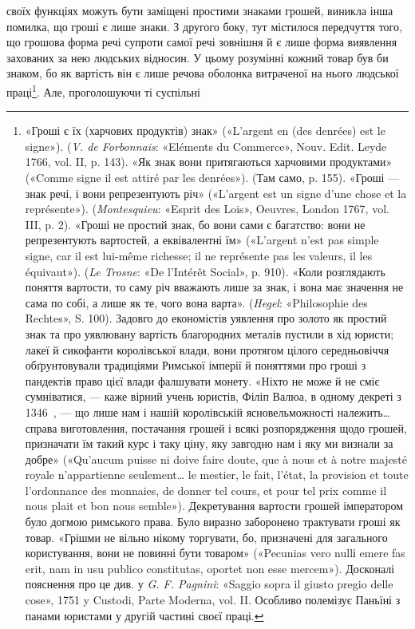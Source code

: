 своїх функціях можуть бути заміщені простими знаками грошей,
виникла інша помилка, що гроші є лише знаки. З другого боку,
тут містилося передчуття того, що грошова форма речі супроти
самої речі зовнішня й є лише форма виявлення захованих за нею
людських відносин. У цьому розумінні кожний товар був би
знаком, бо як вартість він є лише речова оболонка витраченої
на нього людської праці\footnote{
«Гроші є їх (харчових продуктів) знак» («L’argent en (des denrées)
est le signe»). (\emph{V. de Forbonnais}: «Eléments du Commerce»,
Nouv. Edit. Leyde 1766, vol. II, p. 143). «Як знак вони притягаються
харчовими продуктами» («Comme signe il est attiré par les denrées»). (Там
само, p. 155). «Гроші — знак речі, і вони репрезентують річ» («L’argent
est un signe d’une chose et la représente»). (\emph{Montesquieu}: «Esprit des
Lois», Oeuvres, London 1767, vol. III, p. 2). «Гроші не простий знак,
бо вони сами є багатство: вони не репрезентують вартостей, а еквівалентні
їм» («L’argent n’est pas simple signe, car il est lui-même richesse; il
ne représente pas les valeurs, il les équivaut»). (\emph{Le Trosne}: «De l’Intérêt
Social», p. 910). «Коли розглядають поняття вартости, то саму річ
вважають лише за знак, і вона має значення не сама по собі, а лише як
те, чого вона варта». (\emph{Hegel}: «Philosophie des Rechtes», S. 100). Задовго
до економістів уявлення про золото як простий знак та про уявлювану
вартість благородних металів пустили в хід юристи; лакеї й сикофанти
королівської влади, вони протягом цілого середньовіччя обґрунтовували
традиціями Римської імперії й поняттями про гроші з пандектів
право цієї влади фалшувати монету. «Ніхто не може й не сміє сумніватися,
— каже вірний учень юристів, Філіп Валюа, в одному декреті з 1346~, —
що лише нам і нашій королівській ясновельможності належить\dots{} справа
виготовлення, постачання грошей і всякі розпорядження щодо грошей,
призначати їм такий курс і таку ціну, яку завгодно нам і яку ми визнали
за добре» («Qu’aucum puisse ni doive faire doute, que à nous et à notre
majesté royale n’appartienne seulement\dots{} le mestier, le fait, l’état, la provision
et toute l’ordonnance des monnaies, de donner tel cours, et pour tel
prix comme il nous plait et bon nous semble»). Декретування вартости
грошей імператором було догмою римського права. Було виразно заборонено
трактувати гроші як товар. «Грішми не вільно нікому торгувати,
бо, призначені для загального користування, вони не повинні бути товаром»
(«Pecunias vero nullі emere fas erit, nam in usu publico constitutas,
oportet non esse mercem»). Досконалі пояснення про це див. у \emph{G. F. Pagnini}:
«Saggio sopra il giusto pregio delle cose», 1751 y Custodi, Parte
Moderna, vol. II. Особливо полемізує Паньїні з панами юристами у другій
частині своєї праці.
}. Але, проголошуючи ті суспільні
